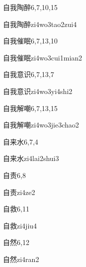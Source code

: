\begin{entry}{自我陶醉}{6,7,10,15}
  \begin{phonetics}{自我陶醉}{zi4wo3tao2zui4}
  \end{phonetics}
\end{entry}

\begin{entry}{自我催眠}{6,7,13,10}
  \begin{phonetics}{自我催眠}{zi4wo3cui1mian2}
  \end{phonetics}
\end{entry}

\begin{entry}{自我意识}{6,7,13,7}
  \begin{phonetics}{自我意识}{zi4wo3yi4shi2}
  \end{phonetics}
\end{entry}

\begin{entry}{自我解嘲}{6,7,13,15}
  \begin{phonetics}{自我解嘲}{zi4wo3jie3chao2}
  \end{phonetics}
\end{entry}

\begin{entry}{自来水}{6,7,4}
  \begin{phonetics}{自来水}{zi4lai2shui3}
  \end{phonetics}
\end{entry}

\begin{entry}{自责}{6,8}
  \begin{phonetics}{自责}{zi4ze2}
  \end{phonetics}
\end{entry}

\begin{entry}{自救}{6,11}
  \begin{phonetics}{自救}{zi4jiu4}
  \end{phonetics}
\end{entry}

\begin{entry}{自然}{6,12}
  \begin{phonetics}{自然}{zi4ran2}
  \end{phonetics}
\end{entry}

